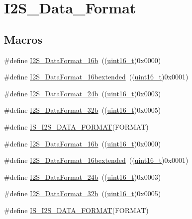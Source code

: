 \hypertarget{group___i2_s___data___format}{}\section{I2\+S\+\_\+\+Data\+\_\+\+Format}
\label{group___i2_s___data___format}
\subsection*{Macros}
\begin{DoxyCompactItemize}
\item 
\#define \hyperlink{group___i2_s___data___format_gabcd7cb799b68346a735709cc135bd414}{I2\+S\+\_\+\+Data\+Format\+\_\+16b}~((\hyperlink{_p_e___types_8h_a1f1825b69244eb3ad2c7165ddc99c956}{uint16\+\_\+t})0x0000)
\item 
\#define \hyperlink{group___i2_s___data___format_gae44b9704c9e393d5abec9bf4fcfe1116}{I2\+S\+\_\+\+Data\+Format\+\_\+16bextended}~((\hyperlink{_p_e___types_8h_a1f1825b69244eb3ad2c7165ddc99c956}{uint16\+\_\+t})0x0001)
\item 
\#define \hyperlink{group___i2_s___data___format_ga5a959486671cf00c5a734f1df205581b}{I2\+S\+\_\+\+Data\+Format\+\_\+24b}~((\hyperlink{_p_e___types_8h_a1f1825b69244eb3ad2c7165ddc99c956}{uint16\+\_\+t})0x0003)
\item 
\#define \hyperlink{group___i2_s___data___format_ga6be3bdcc713cb92a9ad247de013a5e37}{I2\+S\+\_\+\+Data\+Format\+\_\+32b}~((\hyperlink{_p_e___types_8h_a1f1825b69244eb3ad2c7165ddc99c956}{uint16\+\_\+t})0x0005)
\item 
\#define \hyperlink{group___i2_s___data___format_gac467da829eca4a5c4ce41a6abd2d8e81}{I\+S\+\_\+\+I2\+S\+\_\+\+D\+A\+T\+A\+\_\+\+F\+O\+R\+M\+AT}(F\+O\+R\+M\+AT)
\item 
\#define \hyperlink{group___i2_s___data___format_gabcd7cb799b68346a735709cc135bd414}{I2\+S\+\_\+\+Data\+Format\+\_\+16b}~((\hyperlink{_p_e___types_8h_a1f1825b69244eb3ad2c7165ddc99c956}{uint16\+\_\+t})0x0000)
\item 
\#define \hyperlink{group___i2_s___data___format_gae44b9704c9e393d5abec9bf4fcfe1116}{I2\+S\+\_\+\+Data\+Format\+\_\+16bextended}~((\hyperlink{_p_e___types_8h_a1f1825b69244eb3ad2c7165ddc99c956}{uint16\+\_\+t})0x0001)
\item 
\#define \hyperlink{group___i2_s___data___format_ga5a959486671cf00c5a734f1df205581b}{I2\+S\+\_\+\+Data\+Format\+\_\+24b}~((\hyperlink{_p_e___types_8h_a1f1825b69244eb3ad2c7165ddc99c956}{uint16\+\_\+t})0x0003)
\item 
\#define \hyperlink{group___i2_s___data___format_ga6be3bdcc713cb92a9ad247de013a5e37}{I2\+S\+\_\+\+Data\+Format\+\_\+32b}~((\hyperlink{_p_e___types_8h_a1f1825b69244eb3ad2c7165ddc99c956}{uint16\+\_\+t})0x0005)
\item 
\#define \hyperlink{group___i2_s___data___format_gac467da829eca4a5c4ce41a6abd2d8e81}{I\+S\+\_\+\+I2\+S\+\_\+\+D\+A\+T\+A\+\_\+\+F\+O\+R\+M\+AT}(F\+O\+R\+M\+AT)
\end{DoxyCompactItemize}


